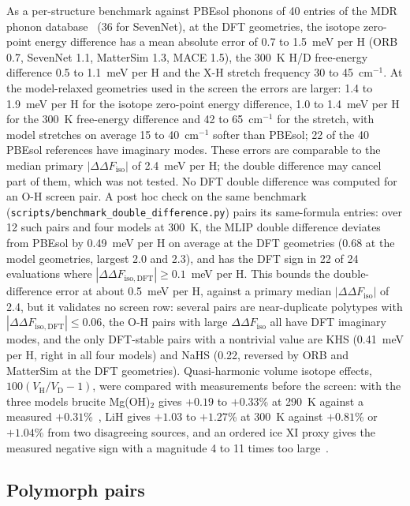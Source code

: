 \documentclass[aps,prmaterials,reprint,superscriptaddress,nofootinbib]{revtex4-2}
\newcommand{\ddF}{\Delta\Delta F_{\mathrm{iso}}}
\begin{document}
As a per-structure benchmark against PBEsol phonons of 40 entries of the MDR phonon database~\cite{Togo2023,Loew2025} (36 for SevenNet), at the DFT geometries, the isotope zero-point energy difference has a mean absolute error of 0.7 to 1.5~meV per H (ORB 0.7, SevenNet 1.1, MatterSim 1.3, MACE 1.5), the 300~K H/D free-energy difference 0.5 to 1.1~meV per H and the X-H stretch frequency 30 to 45~cm$^{-1}$. At the model-relaxed geometries used in the screen the errors are larger: 1.4 to 1.9~meV per H for the isotope zero-point energy difference, 1.0 to 1.4~meV per H for the 300~K free-energy difference and 42 to 65~cm$^{-1}$ for the stretch, with model stretches on average 15 to 40~cm$^{-1}$ softer than PBEsol; 22 of the 40 PBEsol references have imaginary modes. These errors are comparable to the median primary $|\ddF|$ of 2.4~meV per H; the double difference may cancel part of them, which was not tested. No DFT double difference was computed for an O-H screen pair. A post hoc check on the same benchmark (\texttt{scripts/benchmark\_double\_difference.py}) pairs its same-formula entries: over 12 such pairs and four models at 300~K, the MLIP double difference deviates from PBEsol by 0.49~meV per H on average at the DFT geometries (0.68 at the model geometries, largest 2.0 and 2.3), and has the DFT sign in 22 of 24 evaluations where $|\Delta\Delta F_{\mathrm{iso,DFT}}| \geq 0.1$~meV per H. This bounds the double-difference error at about 0.5~meV per H, against a primary median $|\ddF|$ of 2.4, but it validates no screen row: several pairs are near-duplicate polytypes with $|\Delta\Delta F_{\mathrm{iso,DFT}}| \leq 0.06$, the O-H pairs with large $\ddF$ all have DFT imaginary modes, and the only DFT-stable pairs with a nontrivial value are KHS (0.41~meV per H, right in all four models) and NaHS (0.22, reversed by ORB and MatterSim at the DFT geometries). Quasi-harmonic volume isotope effects, $100(V_{\mathrm{H}}/V_{\mathrm{D}} - 1)$, were compared with measurements before the screen: with the three models brucite Mg(OH)$_2$ gives $+0.19$ to $+0.33$\% at 290~K against a measured $+0.31$\%~\cite{Chakoumakos2013}, LiH gives $+1.03$ to $+1.27$\% at 300~K against $+0.81$\% or $+1.04$\% from two disagreeing sources, and an ordered ice XI proxy gives the measured negative sign with a magnitude 4 to 11 times too large~\cite{Pamuk2012}.

\subsection{Polymorph pairs}
\end{document}
